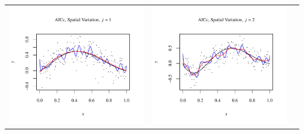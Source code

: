 \documentclass[11pt]{article}
\begin{document}
\begin{table}[h!]
  \begin{center}
    \renewcommand{\arraystretch}{1.5}
    \begin{tabular}{| >{\centering\arraybackslash}m{2.1in} |  >{\centering\arraybackslash}m{2.1in} |  >{\centering\arraybackslash}m{2.1in}|}
      \hline
      \includegraphics[width=1\linewidth,height=0.18\textheight]{Graphs/3/3/assignment5_a_3_3_1}&
      \includegraphics[width=1\linewidth,height=0.18\textheight]{Graphs/3/3/assignment5_a_3_3_2}&

\end{tabular}
\end{center}
\end{table}
\end{document}
